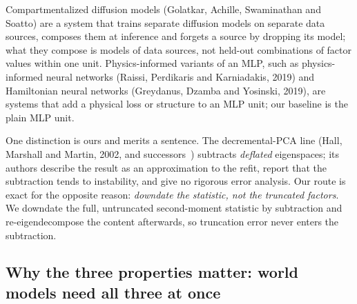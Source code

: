 \documentclass{article} %
\begin{document}
Compartmentalized diffusion models (Golatkar, Achille, Swaminathan and Soatto\nocite{golatkar2023training}) are a system that
trains separate diffusion models on separate data sources, composes them at inference and forgets a
source by dropping its model; what they compose is models of data sources, not held-out
combinations of factor values within one unit.
Physics-informed variants of an MLP, such as physics-informed neural networks (Raissi, Perdikaris
and Karniadakis, 2019\nocite{raissi2019physics}) and Hamiltonian neural networks (Greydanus, Dzamba and Yosinski, 2019\nocite{greydanus2019hamiltonian}), are
systems that add a physical loss or structure to an MLP unit; our baseline is the plain MLP unit.

One distinction is ours and merits a sentence. The decremental-PCA
line (Hall, Marshall and Martin, 2002\nocite{hall2002adding}, and successors~\citep{jin2014evd,lee2021fast}) subtracts \emph{deflated} eigenspaces;
its authors describe the result as an approximation to the refit, report that the subtraction
tends to instability, and give no rigorous error analysis. Our route is exact for the opposite
reason: \emph{downdate the statistic, not the truncated factors}. We downdate the full,
untruncated second-moment statistic by subtraction and re-eigendecompose the content
afterwards, so truncation error never enters the subtraction.

\subsection{Why the three properties matter: world models need all three at once}
\label{sec:why}
\end{document}

